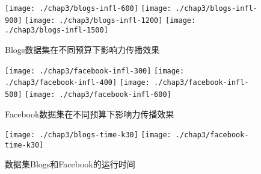 \begin{figure}[H]
	\centering%
	{\texttt{[image: ./chap3/blogs-infl-600]}}
	\hspace{3em}%
	{\texttt{[image: ./chap3/blogs-infl-900]}}
	\hspace{3em}%
	{\texttt{[image: ./chap3/blogs-infl-1200]}}
	\hspace{3em}%
	{\texttt{[image: ./chap3/blogs-infl-1500]}}
	\caption{Blogs数据集在不同预算下影响力传播效果}
	\label{fig:chap3:blogs-infl}
\end{figure}


\begin{figure}[H]
	\centering%
	{\texttt{[image: ./chap3/facebook-infl-300]}}
	\hspace{3em}%
	{\texttt{[image: ./chap3/facebook-infl-400]}}
	\hspace{3em}%
	{\texttt{[image: ./chap3/facebook-infl-500]}}
	\hspace{3em}%
	{\texttt{[image: ./chap3/facebook-infl-600]}}
	\caption{Facebook数据集在不同预算下影响力传播效果}
	\label{fig:chap3:facebook-infl}
\end{figure}


\begin{figure}[H]
	\centering%
	{\texttt{[image: ./chap3/blogs-time-k30]}}
	\hspace{3em}%
	{\texttt{[image: ./chap3/facebook-time-k30]}}
	\caption{数据集Blogs和Facebook的运行时间}
	\label{fig:chap3:running-time}
\end{figure}

